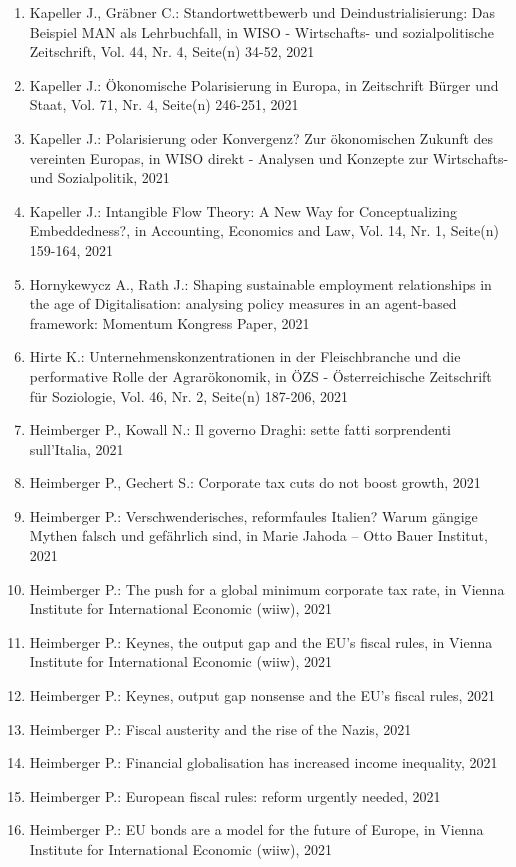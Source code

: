 \begin{enumerate}
	 \item Kapeller J., Gräbner C.: Standortwettbewerb und Deindustrialisierung: Das Beispiel MAN als Lehrbuchfall, in WISO - Wirtschafts- und sozialpolitische Zeitschrift, Vol. 44, Nr. 4, Seite(n) 34-52, 2021
	 \item Kapeller J.: Ökonomische Polarisierung in Europa, in Zeitschrift Bürger und Staat, Vol. 71, Nr. 4, Seite(n) 246-251, 2021
	 \item Kapeller J.: Polarisierung oder Konvergenz? Zur ökonomischen Zukunft des vereinten Europas, in WISO direkt - Analysen und Konzepte zur Wirtschafts- und Sozialpolitik, 2021
	 \item Kapeller J.: Intangible Flow Theory: A New Way for Conceptualizing Embeddedness?, in Accounting, Economics and Law, Vol. 14, Nr. 1, Seite(n) 159-164, 2021
	 \item Hornykewycz A., Rath J.: Shaping sustainable employment relationships in the age of Digitalisation: analysing policy measures in an agent-based framework: Momentum Kongress Paper, 2021
	 \item Hirte K.: Unternehmenskonzentrationen in der Fleischbranche und die performative Rolle der Agrarökonomik, in ÖZS - Österreichische Zeitschrift für Soziologie, Vol. 46, Nr. 2, Seite(n) 187-206, 2021
	 \item Heimberger P., Kowall N.: Il governo Draghi: sette fatti sorprendenti sull’Italia, 2021
	 \item Heimberger P., Gechert S.: Corporate tax cuts do not boost growth, 2021
	 \item Heimberger P.: Verschwenderisches, reformfaules Italien? Warum gängige Mythen falsch und gefährlich sind, in Marie Jahoda – Otto Bauer Institut, 2021
	 \item Heimberger P.: The push for a global minimum corporate tax rate, in Vienna Institute for International Economic (wiiw), 2021
	 \item Heimberger P.: Keynes, the output gap and the EU’s fiscal rules, in Vienna Institute for International Economic (wiiw), 2021
	 \item Heimberger P.: Keynes, output gap nonsense and the EU’s fiscal rules, 2021
	 \item Heimberger P.: Fiscal austerity and the rise of the Nazis, 2021
	 \item Heimberger P.: Financial globalisation has increased income inequality, 2021
	 \item Heimberger P.: European fiscal rules: reform urgently needed, 2021
	 \item Heimberger P.: EU bonds are a model for the future of Europe, in Vienna Institute for International Economic (wiiw), 2021

\end{enumerate}
